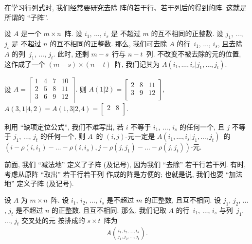 \documentclass[%
    UTF8,%
    fontset=none,%
    punct=kaiming,%
    zihao=-4,%
    a4paper,%
    oneside,%
]{ctexbook}
\let\emph\relax
\begin{document}
在学习行列式时, 我们经常要研究去除%
阵的若干行、若干列后的得到的阵.
这就是所谓的 ``子阵''.

\begin{definition}[子阵, 1]
    设 \(A\) 是一个 \(m \times n\)~阵.
    设 \(i_1\), \(\dots\), \(i_s\) 是%
    不超过 \(m\) 的互不相同的正整数.
    设 \(j_1\), \(\dots\), \(j_t\) 是%
    不超过 \(n\) 的互不相同的正整数.
    那么, 我们可去除 \(A\) 的行~\(i_1\), \(\dots\), \(i_s\),
    且去除 \(A\) 的列~\(j_1\), \(\dots\), \(j_t\).
    此时, 还剩 \(m - s\)~行与 \(n - t\)~列.
    不改变不被去除的元的位置,
    这作成了一个 \((m - s) \times (n - t)\)~阵,
    我们记其为
    \(A({i_1, \dots, i_s}|{j_1, \dots, j_t})\).
\end{definition}

\begin{example}
    设
    \(
    A =
    \begin{bmatrix}
        1 & 4 & 7 & 10 \\
        2 & 5 & 8 & 11 \\
        3 & 6 & 9 & 12 \\
    \end{bmatrix}.
    \)
    则
    \(
    A(1|2) =
    \begin{bmatrix}
        2 & 8 & 11 \\
        3 & 9 & 12 \\
    \end{bmatrix},
    \)
    \(
    A(3,1|4,2) = A(1,3|2,4) =
    \begin{bmatrix}
        2 & 8 \\
    \end{bmatrix}.
    \)
\end{example}

利用 ``缺项定位公式'', 我们不难写出,
若 \(i\) 不等于 \(i_1\), \(\dots\), \(i_s\) 的任何一个,
且 \(j\) 不等于 \(j_1\), \(\dots\), \(j_t\) 的任何一个,
则 \(A\)~的 \((i, j)\)-元一定是
\(A({i_1, \dots, i_s}|{j_1, \dots, j_t})\)~的
\((i - \rho(i, i_1) - \dots - \rho(i, i_s),
j - \rho(j, j_1) - \dots - \rho(j, j_t))\)-元.

前面, 我们 ``减法地'' 定义了子阵 (及记号),
因为我们 ``去除'' 若干行若干列.
有时, 考虑从原阵 ``取出'' 若干行若干列%
作成的阵是方便的;
也就是说, 我们也要 ``加法地'' 定义子阵 (及记号).

\begin{definition}[子阵, 2]
    设 \(A\) 为 \(m \times n\)~阵.
    设 \(i_1\), \(i_2\), \(\dots\), \(i_s\)
    是不超过 \(m\) 的正整数,
    且互不相同.
    设 \(j_1\), \(j_2\), \(\dots\), \(j_t\)
    是不超过 \(n\) 的正整数,
    且互不相同.
    那么, 我们记取 \(A\) 的行~\(i_1\), \(\dots\), \(i_s\)
    与列~\(j_1\), \(\dots\), \(j_t\) 交叉处的元%
    按\emph{原位}排成的 \(s \times t\)~阵为
    \begin{align*}
        A\binom{i_1, i_2, \dots, i_s}{j_1, j_2, \dots, j_t}.
    \end{align*}
\end{definition}
\end{document}
